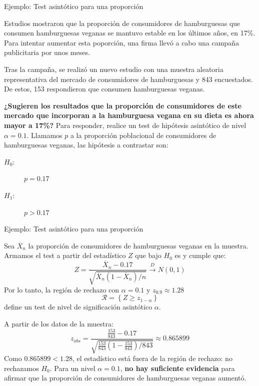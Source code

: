 \documentclass{beamer}
\theoremstyle{definition}
\begin{document}
\begin{frame}{\color{rosee}Ejemplo: Test asint\'otico para una proporci\'on}\small

Estudios mostraron que la proporción de consumidores de hamburguesas que consumen hamburguesas veganas se mantuvo estable en los últimos años, en 17\%. Para intentar aumentar esta poporción, una firma llevó a cabo una campaña publicitaria por unos meses.

\medskip
Tras la campaña, se realizó un nuevo estudio con una muestra aleatoria representativa del mercado de consumidores de hamburguesas y 843 encuestados. De estos, 153 respondieron que consumen hamburguesas veganas.

\medskip
\textbf{¿Sugieren los resultados que la proporción de consumidores de este mercado que incorporan a la hamburguesa vegana en su dieta es ahora mayor a 17\%? }Para responder, realice un test de hipótesis asintótico de nivel $\alpha=0.1$. Llamamos $p$ a la proporción poblacional de consumidores de hamburguesas veganas, las hipótesis a contrastar son:
\begin{description}
\item[$H_0:$] $p = 0.17$
\item[$H_1:$] $p > 0.17$
\end{description}
\end{frame}

\begin{frame}{\color{rosee}Ejemplo: Test asint\'otico para una proporci\'on}\small
  
Sea $\overline{X}_n$ la proporción de consumidores de hamburguesas veganas en la muestra. Armamos el test a partir del estadístico $Z$ que bajo $H_0$ es y cumple que:
\[Z=\frac{\overline{X}_n-0.17}{\sqrt{\overline{X}_n(1-\overline{X}_n)/n}}\xrightarrow{D}N(0,1)\]
 Por lo tanto, la región de rechazo con $\alpha=0.1$ y $z_{0.9}\approx 1.28$
\[\mathcal{R}=\left\{Z\geq z_{1-\alpha}\right\}\]
define un test de nivel de significación asintótico $\alpha$.

 
A partir de los datos de la muestra:
\[z_{obs}=\dfrac{\frac{153}{843}-0.17}{\sqrt{\frac{153}{843}\left(1-\frac{153}{843}\right)/843}}\approx 0.865899\]
 Como $0.865899<1.28$, el estadístico está fuera de la región de rechazo: no rechazamos $H_0$. Para un nivel $\alpha=0.1$, \textbf{no hay suficiente evidencia} para afirmar que la proporción de consumidores de hamburguesas veganas aumentó.

  
\end{frame}
\end{document}
